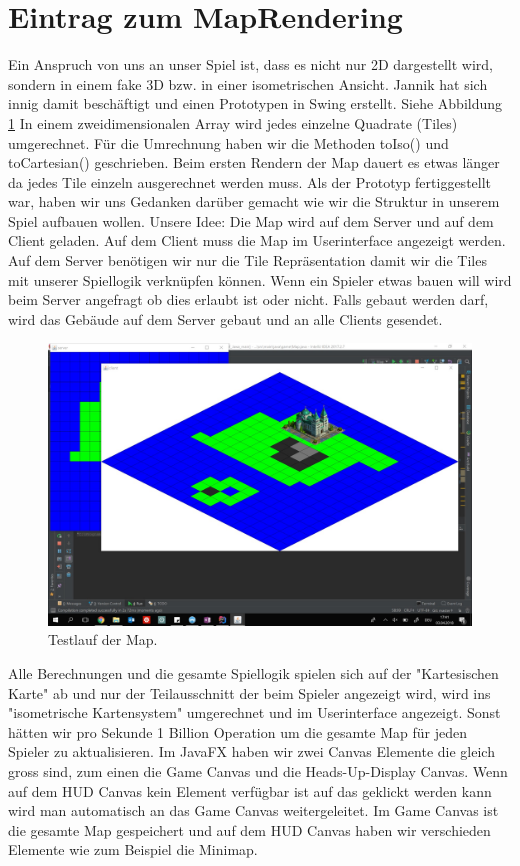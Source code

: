 \documentclass{scrartcl}
\newcommand{\n}{\newline}
\begin{document}
\section*{Eintrag zum MapRendering}
Ein Anspruch von uns an unser Spiel ist, dass es nicht nur 2D dargestellt wird, sondern in einem fake 3D bzw. in einer isometrischen Ansicht. Jannik hat sich innig damit beschäftigt und einen Prototypen in Swing erstellt. Siehe Abbildung \ref{fig:map1}\n
In einem zweidimensionalen Array wird jedes einzelne Quadrate (Tiles) umgerechnet. Für die Umrechnung haben wir die Methoden toIso() und toCartesian() geschrieben. Beim ersten Rendern der Map dauert es etwas länger da jedes Tile einzeln ausgerechnet werden muss. Als der Prototyp fertiggestellt war, haben wir uns Gedanken darüber gemacht wie wir die Struktur in unserem Spiel aufbauen wollen. \n
\n
Unsere Idee:\n
Die Map wird auf dem Server und auf dem Client geladen. Auf dem Client muss die Map im Userinterface angezeigt werden. Auf dem Server benötigen wir nur die Tile Repräsentation damit wir die Tiles mit unserer Spiellogik verknüpfen können. Wenn ein Spieler etwas bauen will wird beim Server angefragt ob dies erlaubt ist oder nicht. Falls gebaut werden darf, wird das Gebäude auf dem Server gebaut und an alle Clients gesendet.


\begin{figure}[H]
	\includegraphics[width=\linewidth]{map1.jpeg}
	\caption{Testlauf der Map.}
	\label{fig:map1}
\end{figure}
Alle Berechnungen und die gesamte Spiellogik spielen sich auf der "Kartesischen Karte" ab und nur der Teilausschnitt der beim Spieler angezeigt wird, wird ins "isometrische Kartensystem" umgerechnet und im Userinterface angezeigt. Sonst hätten wir pro Sekunde 1 Billion Operation um die gesamte Map für jeden Spieler zu aktualisieren. \n
Im JavaFX haben wir zwei Canvas Elemente die gleich gross sind, zum einen die Game Canvas und die Heads-Up-Display Canvas. Wenn auf dem HUD Canvas kein Element verfügbar ist auf das geklickt werden kann wird man automatisch an das Game Canvas weitergeleitet. Im Game Canvas ist die gesamte Map gespeichert und auf dem HUD Canvas haben wir verschieden Elemente wie zum Beispiel die Minimap. 
\end{document}

